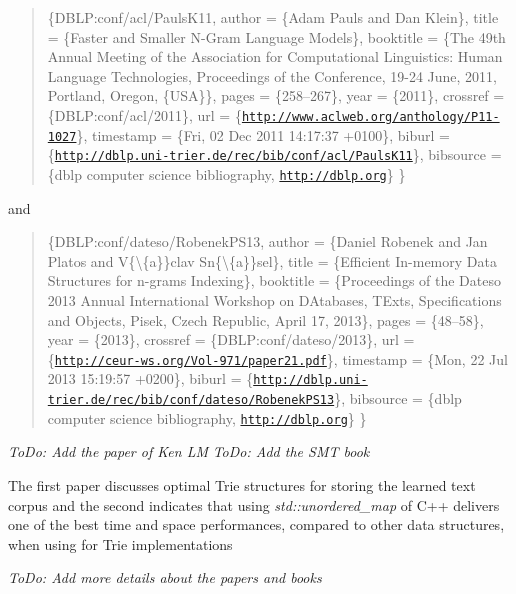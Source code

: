 \begin{quote}
\{D\+B\+L\+P\+:conf/acl/\+Pauls\+K11, author = \{Adam Pauls and Dan Klein\}, title = \{Faster and Smaller N-\/\+Gram Language Models\}, booktitle = \{The 49th Annual Meeting of the Association for Computational Linguistics\+: Human Language Technologies, Proceedings of the Conference, 19-\/24 June, 2011, Portland, Oregon, \{U\+S\+A\}\}, pages = \{258--267\}, year = \{2011\}, crossref = \{D\+B\+L\+P\+:conf/acl/2011\}, url = \{\href{http://www.aclweb.org/anthology/P11-1027}{\tt http\+://www.\+aclweb.\+org/anthology/\+P11-\/1027}\}, timestamp = \{Fri, 02 Dec 2011 14\+:17\+:37 +0100\}, biburl = \{\href{http://dblp.uni-trier.de/rec/bib/conf/acl/PaulsK11}{\tt http\+://dblp.\+uni-\/trier.\+de/rec/bib/conf/acl/\+Pauls\+K11}\}, bibsource = \{dblp computer science bibliography, \href{http://dblp.org}{\tt http\+://dblp.\+org}\} \} \end{quote}


and

\begin{quote}
\{D\+B\+L\+P\+:conf/dateso/\+Robenek\+P\+S13, author = \{Daniel Robenek and Jan Platos and V\{\textbackslash{}\textquotesingle{}\{a\}\}clav Sn\{\textbackslash{}\textquotesingle{}\{a\}\}sel\}, title = \{Efficient In-\/memory Data Structures for n-\/grams Indexing\}, booktitle = \{Proceedings of the Dateso 2013 Annual International Workshop on D\+Atabases, T\+Exts, Specifications and Objects, Pisek, Czech Republic, April 17, 2013\}, pages = \{48--58\}, year = \{2013\}, crossref = \{D\+B\+L\+P\+:conf/dateso/2013\}, url = \{\href{http://ceur-ws.org/Vol-971/paper21.pdf}{\tt http\+://ceur-\/ws.\+org/\+Vol-\/971/paper21.\+pdf}\}, timestamp = \{Mon, 22 Jul 2013 15\+:19\+:57 +0200\}, biburl = \{\href{http://dblp.uni-trier.de/rec/bib/conf/dateso/RobenekPS13}{\tt http\+://dblp.\+uni-\/trier.\+de/rec/bib/conf/dateso/\+Robenek\+P\+S13}\}, bibsource = \{dblp computer science bibliography, \href{http://dblp.org}{\tt http\+://dblp.\+org}\} \} \end{quote}


{\itshape To\+Do\+: Add the paper of Ken L\+M} {\itshape To\+Do\+: Add the S\+M\+T book}

The first paper discusses optimal Trie structures for storing the learned text corpus and the second indicates that using {\itshape std\+::unordered\+\_\+map} of C++ delivers one of the best time and space performances, compared to other data structures, when using for Trie implementations

{\itshape To\+Do\+: Add more details about the papers and books}

